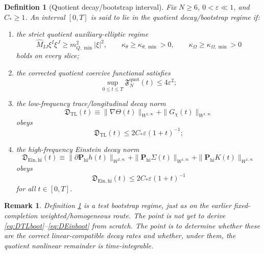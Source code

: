 \documentclass[11pt]{article}
\newtheorem{definition}{Definition}
\newtheorem{remark}{Remark}
\begin{document}
\begin{definition}[Quotient decay/bootstrap interval]
\label{def:decayboot}
Fix \(N\ge 6\), \(0<\varepsilon\ll 1\), and \(C_\ast\ge 1\). An interval \([0,T]\) is said to lie in the \emph{quotient decay/bootstrap regime} if:
\begin{enumerate}
    \item the strict quotient auxiliary-elliptic regime
    \begin{equation}
    \widehat M_{IJ}\xi^I\xi^J\ge m_{Q,\min}^2|\xi|^2,
    \qquad
    \kappa_\theta\ge \kappa_{\theta,\min}>0,
    \qquad
    \kappa_\Omega\ge \kappa_{\Omega,\min}>0
    \label{eq:strict}
    \end{equation}
    holds on every slice;
    \item the corrected quotient coercive functional satisfies
    \begin{equation}
    \sup_{0\le t\le T}\mathfrak F_N^{\mathrm{quot}}(t)\le 4\varepsilon^2;
    \label{eq:Fboot}
    \end{equation}
    \item the low-frequency trace/longitudinal decay norm
    \begin{equation}
    \mathfrak D_{\mathrm{TL}}(t)
    \equiv
    \|\nabla\Theta(t)\|_{W^{1,\infty}}
    +\|G_\chi(t)\|_{W^{1,\infty}}
    \label{eq:DTL}
    \end{equation}
    obeys
    \begin{equation}
    \mathfrak D_{\mathrm{TL}}(t)\le 2C_\ast\varepsilon(1+t)^{-1};
    \label{eq:DTLboot}
    \end{equation}
    \item the high-frequency Einstein decay norm
    \begin{equation}
    \mathfrak D_{\mathrm{Ein,hi}}(t)
    \equiv
    \|\partial \mathbf P_{\mathrm{hi}}h(t)\|_{W^{2,\infty}}
    +\|\mathbf P_{\mathrm{hi}}\Sigma(t)\|_{W^{1,\infty}}
    +\|\mathbf P_{\mathrm{hi}}K(t)\|_{W^{1,\infty}}
    \label{eq:DEin}
    \end{equation}
    obeys
    \begin{equation}
    \mathfrak D_{\mathrm{Ein,hi}}(t)\le 2C_\ast\varepsilon(1+t)^{-1}
    \label{eq:DEinboot}
    \end{equation}
    for all \(t\in[0,T]\).
\end{enumerate}
\end{definition}

\begin{remark}
Definition \ref{def:decayboot} is a test bootstrap regime, just as on the earlier fixed-completion weighted/homogeneous route. The point is not yet to derive \eqref{eq:DTLboot}--\eqref{eq:DEinboot} from scratch. The point is to determine whether these are the correct linear-compatible decay rates and whether, under them, the quotient nonlinear remainder is time-integrable.
\end{remark}
\end{document}
